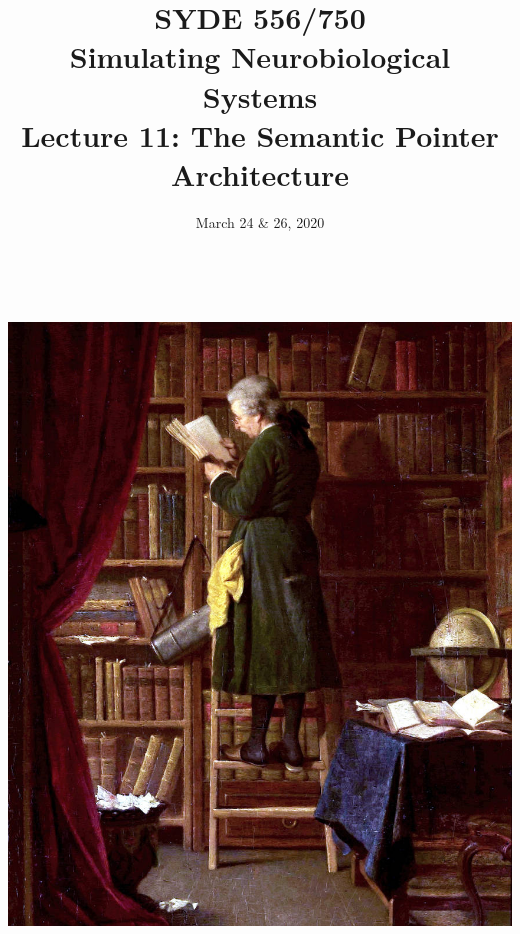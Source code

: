 \documentclass[handout,aspectratio=169]{beamer}
\date{March 24 \& 26, 2020\\[-1cm]~~}
\title{SYDE 556/750 \\ Simulating Neurobiological Systems \\ Lecture 11: The Semantic Pointer Architecture}
\begin{document}
	
	\begin{frame}{}
		\vspace{0.5cm}
		\begin{columns}[c]
			\MakeTitle
			\includegraphics[width=\textwidth]{media/reimer_librarian_small.jpg}
		\end{columns}
	\end{frame}
\end{document}
